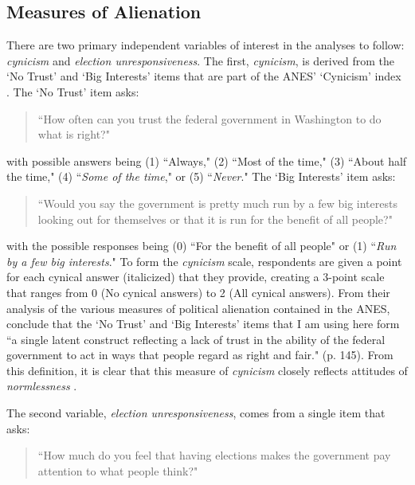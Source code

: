 \documentclass[12pt]{article}
\begin{document}
\subsection{Measures of Alienation}
There are two primary independent variables of interest in the analyses to follow: \textit{cynicism} and \textit{election unresponsiveness}. The first, \textit{cynicism}, is derived from the `No Trust' and `Big Interests' items that are part of the ANES' `Cynicism' index \parencite{mason1985}. The `No Trust' item asks:

\begin{quote}
	``How often can you trust the federal government in Washington to do what is right?"
\end{quote}

\noindent with possible answers being (1) ``Always," (2) ``Most of the time," (3) ``About half the time," (4) ``\textit{Some of the time}," or (5) ``\textit{Never}." The `Big Interests' item asks: 

\begin{quote}
	``Would you say the government is pretty much run by a few big interests looking out for themselves or that it is run for the benefit of all people?"	
\end{quote}

\noindent with the possible responses being (0) ``For the benefit of all people" or (1) ``\textit{Run by a few big interests}." To form the \textit{cynicism} scale, respondents are given a point for each cynical answer (italicized) that they provide, creating a 3-point scale that ranges from 0 (No cynical answers) to 2 (All cynical answers). From their analysis of the various measures of political alienation contained in the ANES, \textcite{mason1985} conclude that the `No Trust' and `Big Interests' items that I am using here form ``a single latent construct reflecting a lack of trust in the ability of the federal government to act in ways that people regard as right and fair." (p. 145). From this definition, it is clear that this measure of \textit{cynicism} closely reflects attitudes of \textit{normlessness} \parencite{finifter1970dimensions}.

The second variable, \textit{election unresponsiveness}, comes from a single item that asks:

\begin{quote}
	``How much do you feel that having elections makes the government pay attention to what people think?"
\end{quote}
\end{document}
